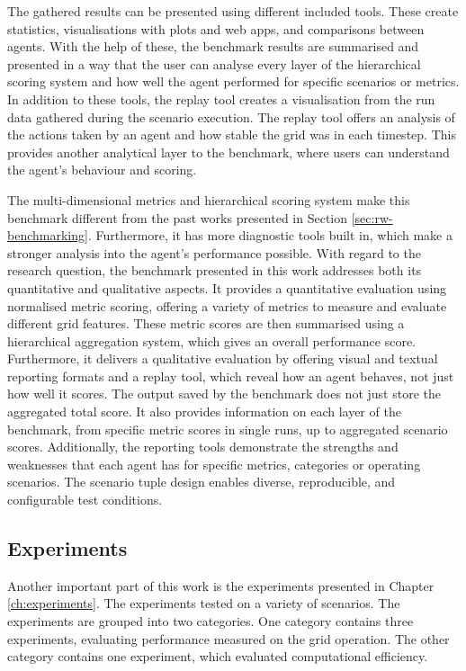 The gathered results can be presented using different included tools. These create statistics, visualisations with plots and web apps, and comparisons between agents. With the help of these, the benchmark results are summarised and presented in a way that the user can analyse every layer of the hierarchical scoring system and how well the agent performed for specific scenarios or metrics. In addition to these tools, the replay tool creates a visualisation from the run data gathered during the scenario execution. The replay tool offers an analysis of the actions taken by an agent and how stable the grid was in each timestep. This provides another analytical layer to the benchmark, where users can understand the agent's behaviour and scoring.

The multi-dimensional metrics and hierarchical scoring system make this benchmark different from the past works presented in Section \ref{sec:rw-benchmarking}. Furthermore, it has more diagnostic tools built in, which make a stronger analysis into the agent's performance possible. With regard to the research question, the benchmark presented in this work addresses both its quantitative and qualitative aspects. It provides a quantitative evaluation using normalised metric scoring, offering a variety of metrics to measure and evaluate different grid features. These metric scores are then summarised using a hierarchical aggregation system, which gives an overall performance score. Furthermore, it delivers a qualitative evaluation by offering visual and textual reporting formats and a replay tool, which reveal how an agent behaves, not just how well it scores. The output saved by the benchmark does not just store the aggregated total score. It also provides information on each layer of the benchmark, from specific metric scores in single runs, up to aggregated scenario scores. Additionally, the reporting tools demonstrate the strengths and weaknesses that each agent has for specific metrics, categories or operating scenarios. The scenario tuple design enables diverse, reproducible, and configurable test conditions. 


\subsection{Experiments}\label{ssec:contribution-experiments}
Another important part of this work is the experiments presented in Chapter \ref{ch:experiments}. The experiments tested \benchmark on a variety of scenarios. The experiments are grouped into two categories. One category contains three experiments, evaluating performance measured on the grid operation. The other category contains one experiment, which evaluated computational efficiency.

